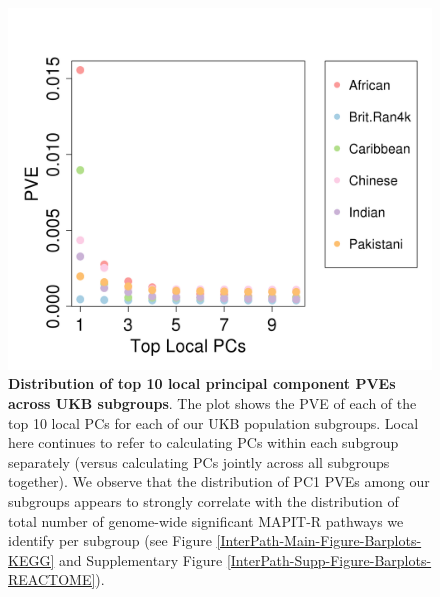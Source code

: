 \documentclass[12pt,a4paper]{article}
\begin{document}
\begin{figure}[htb]
\centering
\includegraphics[scale=.5]{Images/Main/InterPath_Main_Figure_Eigenvalues_vs2.png}
\caption[TBD]{\textbf{Distribution of top 10 local principal component PVEs across UKB subgroups}. The plot shows the PVE of each of the top 10 local PCs for each of our UKB population subgroups. Local here continues to refer to calculating PCs within each subgroup separately (versus calculating PCs jointly across all subgroups together). We observe that the distribution of PC1 PVEs among our subgroups appears to strongly correlate with the distribution of total number of genome-wide significant MAPIT-R pathways we identify per subgroup (see Figure \ref{InterPath-Main-Figure-Barplots-KEGG} and  Supplementary Figure \ref{InterPath-Supp-Figure-Barplots-REACTOME}).}
\label{InterPath-Main-Figure-Eigenvalues}
\end{figure}
\end{document}
